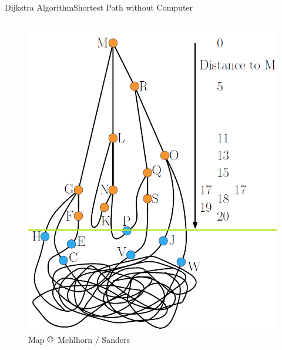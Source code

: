 \begin{frame}{Dijkstra Algorithm}{Shortest Path without Computer}
\begin{columns}
\begin{column}{0.45\linewidth}
\begin{figure}[!t]
        \includegraphics[width=\linewidth]
          {Images/Dijkstra/DijkstraTree_WithOverlay}
        \vspace{-0.5em}
        \caption{Map $\copyright\,$ Mehlhorn / Sanders}
      \end{figure}
    \end{column}
  \end{columns}
\end{frame}


